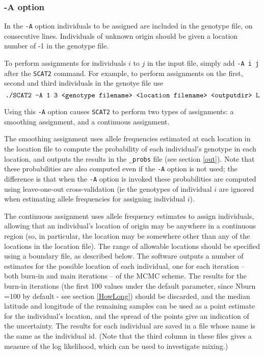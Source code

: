 \documentclass[11pt,titlepage,times,letterpaper]{article}
\def\SCAT{{\tt SCAT2} }
\begin{document}
\subsubsection{-A option}

In the {\tt -A} option
individuals to be assigned are included in the genotype file, on
consecutive lines. Individuals of unknown origin should be given a
location number of -1 in the genotype file.  

To perform assignments for individuals $i$ to $j$ in the input file,
simply add {\tt -A i j} after the \SCAT command. For example, to
perform assignments on the first, second and third individuals in the
genotye file use
$$\text{\tt ./SCAT2 -A 1 3 <genotype filename> <location filename> <outputdir> L}$$

Using this {\tt -A} option causes \SCAT to perform two types of
assignments: a smoothing assignment, and a continuous assignment.  

The smoothing assignment uses allele frequencies estimated at each
location in the location file to compute the probability of each
individual's genotype in each location, and outputs the results in the
{\tt \_probs} file (see section \ref{out}). Note that these
probabilities are also computed even if the {\tt -A} option is not
used; the difference is that when the {\tt -A} option is invoked these
probabilities are computed using leave-one-out cross-validation (ie
the genotypes of individual $i$ are ignored when estimating allele
frequencies for assigning individual $i$).

The continuous assignment uses allele frequency estimates to assign
individuals, allowing that an individual's location of origin may be
anywhere in a continuous region (so, in particular, the location may
be somewhere other than any of the locations in the location
file). The range of allowable locations should be specified using a
boundary file, as described below. The software outputs a number of
estimates for the possible location of each individual, one for each
iteration -- both burn-in and main iterations -- of the MCMC
scheme. The results for the burn-in iterations (the first 100 values
under the default parameter, since Nburn =100 by default - see section
\ref{HowLong}) should be discarded, and the median latitude and
longitude of the remaining samples can be used as a point estimate for
the individual's location, and the spread of the points give an
indication of the uncertainty. The results for each individual are saved in a file whose name is the same as the individual id. (Note that the third column in
these files gives a measure of the log likelihood, which can be
used to investigate mixing.)
\end{document}
